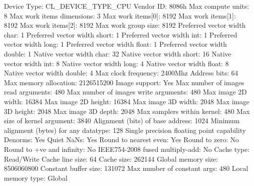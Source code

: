 \begin{codebox}[text]
  Device Type:                                   CL_DEVICE_TYPE_CPU
  Vendor ID:                                     8086h
  Max compute units:                             8
  Max work items dimensions:                     3
    Max work items[0]:                           8192
    Max work items[1]:                           8192
    Max work items[2]:                           8192
  Max work group size:                           8192
  Preferred vector width char:                   1
  Preferred vector width short:                  1
  Preferred vector width int:                    1
  Preferred vector width long:                   1
  Preferred vector width float:                  1
  Preferred vector width double:                 1
  Native vector width char:                      32
  Native vector width short:                     16
  Native vector width int:                       8
  Native vector width long:                      4
  Native vector width float:                     8
  Native vector width double:                    4
  Max clock frequency:                           2400Mhz
  Address bits:                                  64
  Max memory allocation:                         2126515200
  Image support:                                 Yes
  Max number of images read arguments:           480
  Max number of images write arguments:          480
  Max image 2D width:                            16384
  Max image 2D height:                           16384
  Max image 3D width:                            2048
  Max image 3D height:                           2048
  Max image 3D depth:                            2048
  Max samplers within kernel:                    480
  Max size of kernel argument:                   3840
  Alignment (bits) of base address:              1024
  Minimum alignment (bytes) for any datatype:    128
  Single precision floating point capability
    Denorms:                                     Yes
    Quiet NaNs:                                  Yes
    Round to nearest even:                       Yes
    Round to zero:                               No
    Round to +ve and infinity:                   No
    IEEE754-2008 fused multiply-add:             No
  Cache type:                                    Read/Write
  Cache line size:                               64
  Cache size:                                    262144
  Global memory size:                            8506060800
  Constant buffer size:                          131072
  Max number of constant args:                   480
  Local memory type:                             Global

\end{codebox}
